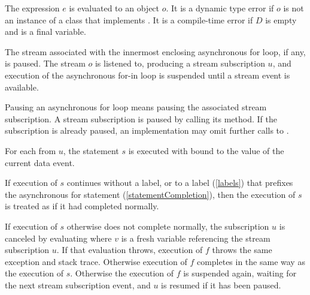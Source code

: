 \documentclass[makeidx]{article}
\begin{document}
{\LMHash{}%
The expression $e$ is evaluated to an object $o$.
It is a dynamic type error if $o$ is not an instance of a class that implements .
It is a compile-time error if $D$ is empty and \id{} is a final variable.

\LMHash{}%
The stream associated with the innermost enclosing asynchronous for loop, if any, is paused.
The stream $o$ is listened to, producing a stream subscription $u$,
and execution of the asynchronous for-in loop is suspended
until a stream event is available.

Pausing an asynchronous for loop means pausing the associated stream subscription.
A stream subscription is paused by calling its  method.
If the subscription is already paused, an implementation may omit further calls to .


\LMHash{}%
For each  from $u$,
the statement $s$ is executed with \id{} bound to the value of the current data event.


\LMHash{}%
If execution of $s$ continues without a label, or to a label (\ref{labels}) that prefixes the asynchronous for statement (\ref{statementCompletion}), then the execution of $s$ is treated as if it had completed normally.

If execution of $s$ otherwise does not complete normally, the subscription $u$ is canceled by evaluating  where $v$ is a fresh variable referencing the stream subscription $u$.
If that evaluation throws,
execution of $f$ throws the same exception and stack trace.
Otherwise execution of $f$ completes in the same way as the execution of $s$.
Otherwise the execution of $f$ is suspended again, waiting for the next stream subscription event, and $u$ is resumed if it has been paused.

}
\end{document}
